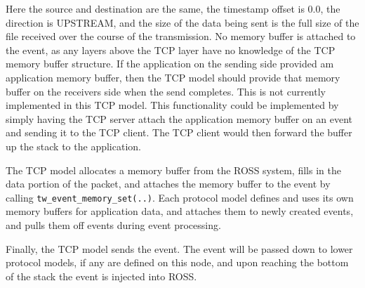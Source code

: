 \documentclass[conference,onecolumn]{IEEEtran}
\begin{document}
Here the source and destination are the same, the timestamp offset is 0.0, the direction is UPSTREAM, and the size of the data being sent is the full size of the file received over the course of the transmission.  No memory buffer is attached to the event, as any layers above the TCP layer have no knowledge of the TCP memory buffer structure.  If the application on the sending side provided am application memory buffer, then the TCP model should provide that memory buffer on the receivers side when the send completes.  This is not currently implemented in this TCP model.  This functionality could be implemented by simply having the TCP server attach the application memory buffer on an event and sending it to the TCP client.  The TCP client would then forward the buffer up the stack to the application.

The TCP model allocates a memory buffer from the ROSS system, fills in the data portion of the packet, and attaches the memory buffer to the event by calling {\tt tw\_event\_memory\_set(..)}.  Each protocol model defines and uses its own memory buffers for application data, and attaches them to newly created events, and pulls them off events during event processing.

Finally, the TCP model sends the event.  The event will be passed down to lower protocol models, if any are defined on this node, and upon reaching the bottom of the stack the event is injected into ROSS.




\end{document}
